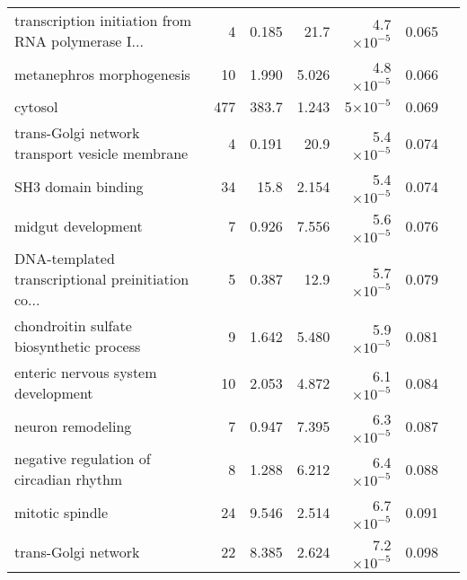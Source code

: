 \begin{longtable}{|l|r|r|r|r|r|}
 transcription initiation from RNA polymerase I... &                       4 &                   0.185 &       21.7 &  4.7$\times 10^{-5}$ &                        0.065~~ \\
                         metanephros morphogenesis &                      10 &                   1.990 &      5.026 &  4.8$\times 10^{-5}$ &                        0.066~~ \\
                                           cytosol &                     477 &                   383.7 &      1.243 &    5$\times 10^{-5}$ &                        0.069~~ \\
    trans-Golgi network transport vesicle membrane &                       4 &                   0.191 &       20.9 &  5.4$\times 10^{-5}$ &                        0.074~~ \\
                                SH3 domain binding &                      34 &                    15.8 &      2.154 &  5.4$\times 10^{-5}$ &                        0.074~~ \\
                                midgut development &                       7 &                   0.926 &      7.556 &  5.6$\times 10^{-5}$ &                        0.076~~ \\
 DNA-templated transcriptional preinitiation co... &                       5 &                   0.387 &       12.9 &  5.7$\times 10^{-5}$ &                        0.079~~ \\
          chondroitin sulfate biosynthetic process &                       9 &                   1.642 &      5.480 &  5.9$\times 10^{-5}$ &                        0.081~~ \\
                enteric nervous system development &                      10 &                   2.053 &      4.872 &  6.1$\times 10^{-5}$ &                        0.084~~ \\
                                 neuron remodeling &                       7 &                   0.947 &      7.395 &  6.3$\times 10^{-5}$ &                        0.087~~ \\
           negative regulation of circadian rhythm &                       8 &                   1.288 &      6.212 &  6.4$\times 10^{-5}$ &                        0.088~~ \\
                                   mitotic spindle &                      24 &                   9.546 &      2.514 &  6.7$\times 10^{-5}$ &                        0.091~~ \\
                               trans-Golgi network &                      22 &                   8.385 &      2.624 &  7.2$\times 10^{-5}$ &                        0.098~~ \\

\end{longtable}
